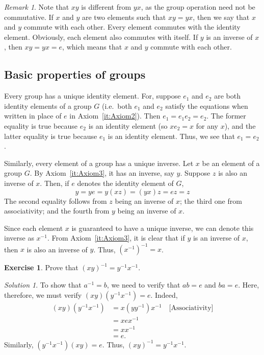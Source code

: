 \documentclass[svgnames]{article}
\theoremstyle{definition}
\newtheorem{Exercise}{Exercise}[section]
\theoremstyle{remark}
\newtheorem*{Remark*}{Remark}
\newtheorem*{Solution*}{Solution}
\newcommand{\newterm}[1]{{\color{alertcolor} #1}}
\begin{document}
\begin{Remark*}
Note that $xy$ is different from $yx$, as the group operation need not be commutative. If $x$ and $y$ are two elements such that $xy = yx$, then we say that $x$ and $y$ \newterm{commute} with each other. Every element commutes with the identity element. Obviously, each element also commutes with itself. If $y$ is an inverse of $x$, then $xy = yx = e$, which means that $x$ and $y$ commute with each other.
\end{Remark*}

\subsection{Basic properties of groups}\label{subsec:BasicProps}

Every group has a unique identity element. For, suppose $e_1$ and $e_2$ are both identity elements of a group $G$ (i.e.\ both $e_1$ and $e_2$ satisfy the equations when written in place of $e$ in Axiom~\ref{it:Axiom2}). Then $e_1 = e_1 e_2 = e_2$. The former equality is true because $e_2$ is an identity element (so $x e_2 = x$ for any $x$), and the latter equality is true because $e_1$ is an identity element. Thus, we see that $e_1 = e_2$.

Similarly, every element of a group has a unique inverse. Let $x$ be an element of a group $G$. By Axiom~\ref{it:Axiom3}, it has an inverse, say $y$. Suppose $z$ is also an inverse of $x$. Then, if $e$ denotes the identity element of $G$,
\begin{equation*}
y = ye = y(xz) = (yx)z = ez = z
\end{equation*}
The second equality follows from $z$ being an inverse of $x$; the third one from associativity; and the fourth from $y$ being an inverse of $x$.

\label{def:Inverse} Since each element $x$ is guaranteed to have a unique inverse, we can denote this inverse as $x^{-1}$. From Axiom~\ref{it:Axiom3}, it is clear that if $y$ is an inverse of $x$, then $x$ is also an inverse of $y$. Thus, $(x^{-1})^{-1} = x$.

\begin{Exercise}
Prove that $(xy)^{-1} = y^{-1} x^{-1}$.

\begin{Solution*}
To show that $a^{-1} = b$, we need to verify that $ab = e$ and $ba = e$. Here, therefore, we must verify $(xy)(y^{-1} x^{-1}) = e$. Indeed,
\begin{align*}
(xy)(y^{-1} x^{-1}) & = x(y y^{-1}) x^{-1} \quad \text{[Associativity]}\\
	& = xex^{-1}\\
	& = xx^{-1}\\
	& = e.
\end{align*}
Similarly, $(y^{-1}x^{-1})(xy) = e$. Thus, $(xy)^{-1} = y^{-1}x^{-1}$.
\end{Solution*}
\end{Exercise}
\end{document}
